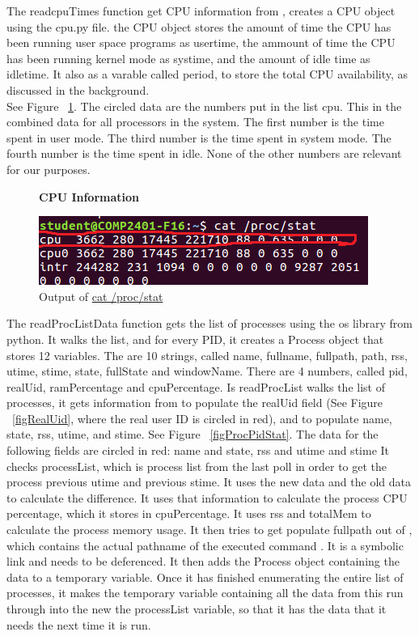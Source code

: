 \documentclass[12pt]{article}
\begin{document}
The readcpuTimes function get CPU information from , creates a CPU object using the cpu.py file. the CPU object stores the amount of time the CPU has been running user space programs as usertime, the ammount of time the CPU has been running kernel mode as systime, and the amount of idle time as idletime. It also as a varable called period, to store the total CPU availability, as discussed in the background.\\
See Figure ~\ref{figCPUInfo}.
The circled data are the numbers put in the list cpu.
This in the combined data for all processors in the system.
The first number is the time spent in user mode.
The third number is the time spent in system mode.
The fourth number is the time spent in idle.
None of the other numbers are relevant for our purposes.\\
\begin{figure}[h]
	\centering
	\textbf{CPU Information}\par\medskip
	\includegraphics{totalCPU}
	\caption{Output of \url{cat /proc/stat}}
	\label{figCPUInfo}
\end{figure}
The readProcListData function gets the list of processes using the os library from python. It walks the list, and for every PID, it creates a Process object that stores 12 variables. The are 10 strings, called name, fullname, fullpath, path, rss, utime, stime, state, fullState and windowName. There are 4 numbers, called pid, realUid, ramPercentage and cpuPercentage. Is readProcList walks the list of processes, it gets information from  to populate the realUid field (See Figure ~\ref{figRealUid}, where the real user ID is circled in red), and  to populate name, state, rss, utime, and stime. See Figure ~\ref{figProcPidStat}. The data for the following fields are circled in red: name and state, rss and utime and stime It checks processList, which is process list from the last poll in order to get the process previous utime and previous stime. It uses the new data and the old data to calculate the difference. It uses that information to calculate the process CPU percentage, which it stores in cpuPercentage. It uses rss and totalMem to calculate the process memory usage. It then tries to get populate fullpath out of , which contains the actual pathname of the executed command \cite{manProc}. It is a symbolic link and needs to be deferenced. It then adds the Process object containing the data to a temporary variable. Once it has finished enumerating the entire list of processes, it makes the temporary variable containing all the data from this run through into the new the processList variable, so that it has the data that it needs the next time it is run.\\
\end{document}
